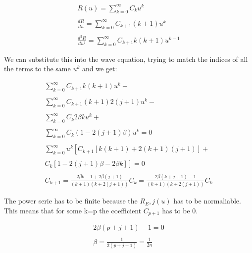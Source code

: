 \begin{equation}
  \begin{array}{c}
    R(u) = \sum_{k=0}^{\infty} C_k u^k
    \\

    \\
    \frac{dR}{du} = \sum_{k=0}^{\infty} C_{k+1} (k+1) u^{k}
    \\

    \\
    \frac{d^2R}{du^2} = \sum_{k=0}^{\infty} C_{k+1} k(k+1) u^{k-1}
  \end{array}
\end{equation}

We can substitute this into the wave equation, trying to match the indices of all the terms to the same $u^{k}$ and we get:

\begin{equation}
  \begin{array}{c}
    \sum_{k=0}^{\infty} C_{k+1} k (k+1) u^k +
    \\

    \\
    \sum_{k=0}^{\infty} C_{k+1} (k+1) 2(j+1) u^k -
    \\

    \\
    \sum_{k=0}^{\infty} C_{k} 2\beta k u^k +
    \\

    \\
    \sum_{k=0}^{\infty} C_{k} (1-2(j+1)\beta) u^k = 0
    \\

    \\
    \sum_{k=0}^{\infty} u^k\left[C_{k+1}\left[k(k+1)+2(k+1)(j+1)\right]+ \right.
    \\

    \\
    \left. C_k \left[ 1-2(j+1)\beta-2\beta k \right]\right] = 0
    \\

    \\
    C_{k+1} =\frac{2\beta k-1+2\beta(j+1)}{(k+1)(k+2(j+1))}C_k = \frac{2\beta (k+j+1)-1}{(k+1)(k+2(j+1))} C_k
  \end{array}
\end{equation}

The power serie has to be finite because the $R_E,j(u)$ has to be normaliable. This means that for some k=p the coefficient $C_{p+1}$ has to be 0.

\begin{equation}
  \begin{array}{c}
    2\beta (p+j+1) -1 = 0
    \\

    \\
    \beta = \frac{1}{2(p+j+1)} = \frac{1}{2n}
  \end{array}
\end{equation}

